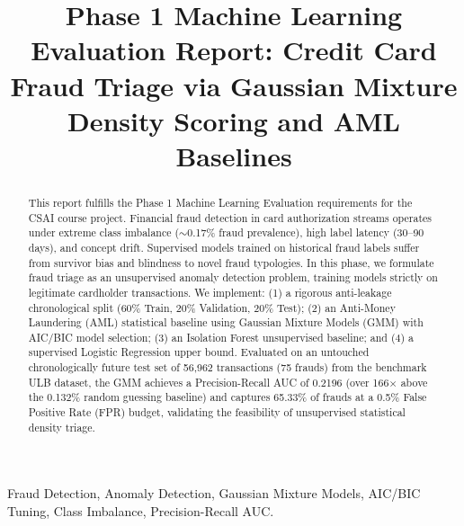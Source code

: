 \documentclass[conference]{IEEEtran}
\begin{document}
\title{Phase 1 Machine Learning Evaluation Report: Credit Card Fraud Triage via Gaussian Mixture Density Scoring and AML Baselines}

\author{
}

\maketitle

\begin{abstract}
This report fulfills the Phase 1 Machine Learning Evaluation requirements for the CSAI course project. Financial fraud detection in card authorization streams operates under extreme class imbalance ($\sim$0.17\% fraud prevalence), high label latency (30--90 days), and concept drift. Supervised models trained on historical fraud labels suffer from survivor bias and blindness to novel fraud typologies. In this phase, we formulate fraud triage as an unsupervised anomaly detection problem, training models strictly on legitimate cardholder transactions. We implement: (1) a rigorous anti-leakage chronological split (60\% Train, 20\% Validation, 20\% Test); (2) an Anti-Money Laundering (AML) statistical baseline using Gaussian Mixture Models (GMM) with AIC/BIC model selection; (3) an Isolation Forest unsupervised baseline; and (4) a supervised Logistic Regression upper bound. Evaluated on an untouched chronologically future test set of 56,962 transactions (75 frauds) from the benchmark ULB dataset, the GMM achieves a Precision-Recall AUC of 0.2196 (over 166$\times$ above the 0.132\% random guessing baseline) and captures 65.33\% of frauds at a 0.5\% False Positive Rate (FPR) budget, validating the feasibility of unsupervised statistical density triage.
\end{abstract}

\begin{IEEEkeywords}
Fraud Detection, Anomaly Detection, Gaussian Mixture Models, AIC/BIC Tuning, Class Imbalance, Precision-Recall AUC.
\end{IEEEkeywords}
\end{document}
